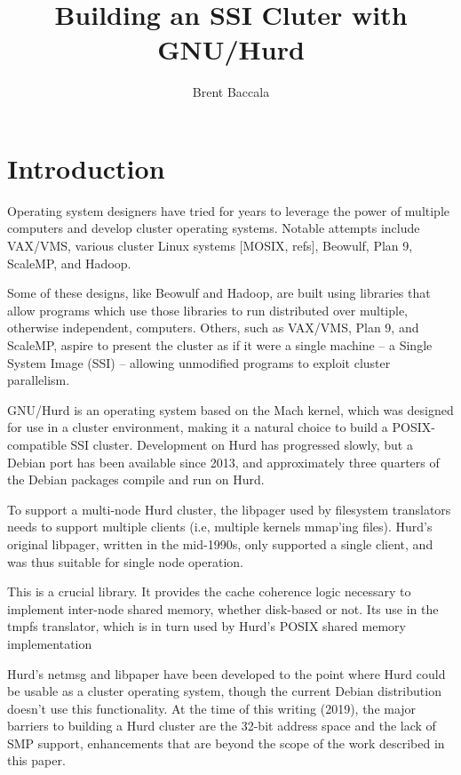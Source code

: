 \documentclass{article}
\title{Building an SSI Cluter with GNU/Hurd}
\author{Brent Baccala}
\date{}
\begin{document}
\maketitle

\section{Introduction}

Operating system designers have tried for years to leverage
the power of multiple computers and develop cluster
operating systems.  Notable attempts include VAX/VMS, various cluster
Linux systems [MOSIX, refs], Beowulf, Plan 9, ScaleMP, and
Hadoop.

Some of these designs, like Beowulf and Hadoop, are built using
libraries that allow programs which use those libraries to run
distributed over multiple, otherwise independent, computers.  Others,
such as VAX/VMS, Plan 9, and ScaleMP, aspire to present the cluster as
if it were a single machine -- a Single System Image (SSI) -- allowing
unmodified programs to exploit cluster parallelism.

GNU/Hurd is an operating system based on the Mach kernel, which was
designed for use in a cluster environment, making it a natural choice
to build a POSIX-compatible SSI cluster.  Development on Hurd has
progressed slowly, but a Debian port has been available since 2013,
and approximately three quarters of the Debian packages compile and
run on Hurd.

To support a multi-node Hurd cluster, the libpager used by filesystem
translators needs to support multiple clients (i.e, multiple kernels
mmap'ing files).  Hurd's original libpager, written in the mid-1990s,
only supported a single client, and was thus suitable for single node
operation.

This is a crucial library.  It provides the cache coherence logic
necessary to implement inter-node shared memory, whether disk-based or
not.  Its use in the tmpfs translator, which is in turn used by
Hurd's POSIX shared memory implementation

Hurd's netmsg and libpaper have been developed to the point where Hurd
could be usable as a cluster operating system, though the current
Debian distribution doesn't use this functionality.  At the time of
this writing (2019), the major barriers to building a Hurd cluster are
the 32-bit address space and the lack of SMP support, enhancements
that are beyond the scope of the work described in this paper.
\end{document}

